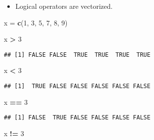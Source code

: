 \documentclass[]{book}
\newenvironment{Shaded}{\begin{snugshade}}{\end{snugshade}}
\newcommand{\DecValTok}[1]{\textcolor[rgb]{0.00,0.00,0.81}{#1}}
\newcommand{\KeywordTok}[1]{\textcolor[rgb]{0.13,0.29,0.53}{\textbf{#1}}}
\newcommand{\NormalTok}[1]{#1}
\newcommand{\OperatorTok}[1]{\textcolor[rgb]{0.81,0.36,0.00}{\textbf{#1}}}
\newcommand{\StringTok}[1]{\textcolor[rgb]{0.31,0.60,0.02}{#1}}
\providecommand{\tightlist}{%
  \setlength{\itemsep}{0pt}\setlength{\parskip}{0pt}}
\begin{document}
\begin{itemize}
\tightlist
\item
  Logical operators are vectorized.
\end{itemize}

\begin{Shaded}
\begin{Highlighting}[]
\NormalTok{x =}\StringTok{ }\KeywordTok{c}\NormalTok{(}\DecValTok{1}\NormalTok{, }\DecValTok{3}\NormalTok{, }\DecValTok{5}\NormalTok{, }\DecValTok{7}\NormalTok{, }\DecValTok{8}\NormalTok{, }\DecValTok{9}\NormalTok{)}
\end{Highlighting}
\end{Shaded}

\begin{Shaded}
\begin{Highlighting}[]
\NormalTok{x }\OperatorTok{>}\StringTok{ }\DecValTok{3}
\end{Highlighting}
\end{Shaded}

\begin{verbatim}
## [1] FALSE FALSE  TRUE  TRUE  TRUE  TRUE
\end{verbatim}

\begin{Shaded}
\begin{Highlighting}[]
\NormalTok{x }\OperatorTok{<}\StringTok{ }\DecValTok{3}
\end{Highlighting}
\end{Shaded}

\begin{verbatim}
## [1]  TRUE FALSE FALSE FALSE FALSE FALSE
\end{verbatim}

\begin{Shaded}
\begin{Highlighting}[]
\NormalTok{x }\OperatorTok{==}\StringTok{ }\DecValTok{3}
\end{Highlighting}
\end{Shaded}

\begin{verbatim}
## [1] FALSE  TRUE FALSE FALSE FALSE FALSE
\end{verbatim}

\begin{Shaded}
\begin{Highlighting}[]
\NormalTok{x }\OperatorTok{!=}\StringTok{ }\DecValTok{3}
\end{Highlighting}
\end{Shaded}
\end{document}
